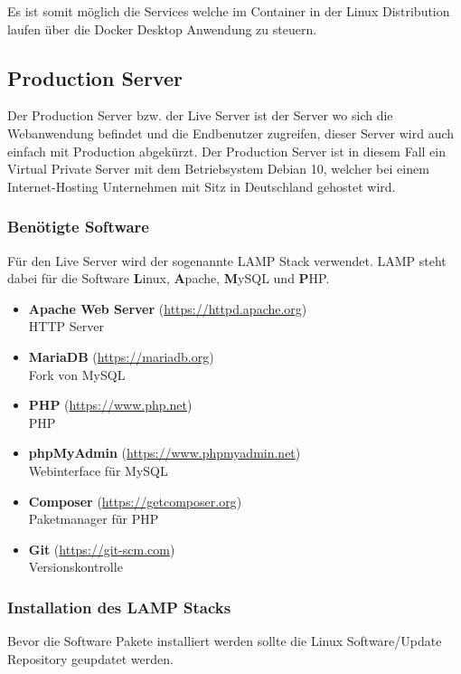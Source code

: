 Es ist somit möglich die Services welche im Container in der Linux Distribution
laufen über die Docker Desktop Anwendung zu steuern.


\subsection{Production Server}
Der Production Server bzw. der Live Server ist der Server wo sich die
Webanwendung befindet und die Endbenutzer zugreifen, dieser Server wird auch
einfach mit Production abgekürzt. Der Production Server ist in diesem Fall ein
Virtual Private Server mit dem Betriebsystem Debian 10, welcher bei einem
Internet-Hosting Unternehmen mit Sitz in Deutschland gehostet wird.


\subsubsection{Benötigte Software}

Für den Live Server wird der sogenannte \glqq LAMP\grqq{} Stack verwendet. LAMP steht dabei
für die Software \textbf{L}inux, \textbf{A}pache, \textbf{M}ySQL und \textbf{P}HP.

\begin{itemize}
  \item \textbf{Apache Web Server} (\url{https://httpd.apache.org}) \\ HTTP Server
  \item \textbf{MariaDB} (\url{https://mariadb.org}) \\ Fork von MySQL
  \item \textbf{PHP} (\url{https://www.php.net}) \\ \ac*{PHP}
  \item \textbf{phpMyAdmin} (\url{https://www.phpmyadmin.net}) \\ Webinterface
        für MySQL
  \item \textbf{Composer} (\url{https://getcomposer.org}) \\ Paketmanager für PHP
  \item \textbf{Git} (\url{https://git-scm.com}) \\ Versionskontrolle
\end{itemize}


\subsubsection{Installation des LAMP Stacks}
Bevor die Software Pakete installiert werden sollte die Linux Software/Update
Repository geupdatet werden.

